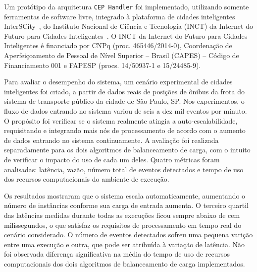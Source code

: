 Um protótipo da arquitetura \texttt{CEP Handler} foi implementado, utilizando somente ferramentas de software livre, integrado à plataforma de cidades inteligentes InterSCity~\citep{del2019design}, do Instituto Nacional de Ciência e Tecnologia (INCT) da Internet do Futuro para Cidades Inteligentes~\citep{Interscitysite}. O INCT da Internet do Futuro para Cidades Inteligentes é financiado por CNPq (proc. 465446/2014-0), Coordenação de Aperfeiçoamento de Pessoal de Nível Superior – Brasil (CAPES) – Código de Financiamento 001 e FAPESP (procs. 14/50937-1 e 15/24485-9). 



Para avaliar o desempenho do sistema, um cenário experimental de cidades inteligentes foi criado, a partir de dados reais de posições de ônibus da frota do sistema de transporte público da cidade de São Paulo, SP.
Nos experimentos, o fluxo de dados entrando no sistema variou de seis a dez mil eventos por minuto. O propósito foi verificar se o sistema realmente atingia a auto-escalabilidade, requisitando e integrando mais nós de processamento de acordo com o aumento de dados entrando no sistema continuamente. A avaliação foi realizada separadamente para os dois algoritmos de balanceamento de carga, com o intuito de verificar o impacto do uso de cada um deles. 
Quatro métricas foram analisadas: latência, vazão, número total de eventos detectados e tempo de uso dos recursos computacionais do ambiente de execução. 

Os resultados mostraram que o sistema escala automaticamente, aumentando o número de instâncias conforme sua carga de entrada aumenta. O terceiro quartil das latências medidas durante todas as execuções ficou sempre abaixo de cem milissegundos, o que satisfaz os requisitos de processamento em tempo real do cenário considerado. O número de eventos detectados sofreu uma pequena varição entre uma execução e outra, que pode ser atribuída à variação de latência. 
Não foi observada diferença significativa na média do tempo de uso de recursos computacionais dos dois algoritmos de balanceamento de
carga implementados.





